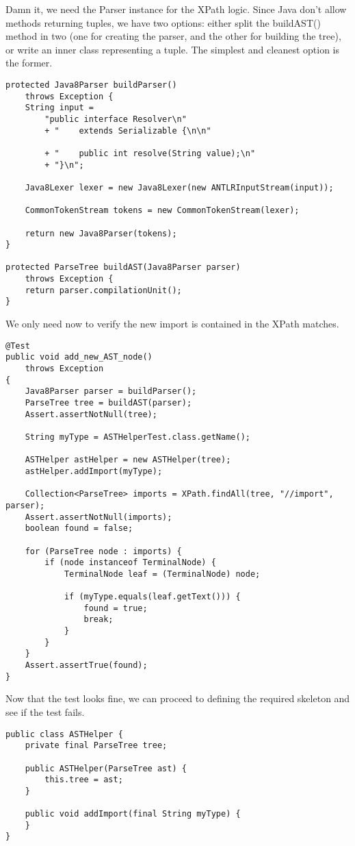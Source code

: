 \documentclass[11pt]{article}
\begin{document}
Damn it, we need the Parser instance for the XPath logic. Since Java don't allow methods returning tuples, we have two options: either split
the buildAST() method in two (one for creating the parser, and the other for building the tree), or write an inner class representing a tuple.
The simplest and cleanest option is the former.

\begin{verbatim}
protected Java8Parser buildParser()
    throws Exception {
    String input =
        "public interface Resolver\n"
        + "    extends Serializable {\n\n"

        + "    public int resolve(String value);\n"
        + "}\n";

    Java8Lexer lexer = new Java8Lexer(new ANTLRInputStream(input));

    CommonTokenStream tokens = new CommonTokenStream(lexer);

    return new Java8Parser(tokens);
}

protected ParseTree buildAST(Java8Parser parser)
    throws Exception {
    return parser.compilationUnit();
}
\end{verbatim}

We only need now to verify the new import is contained in the XPath matches.

\begin{verbatim}
@Test
public void add_new_AST_node()
    throws Exception
{
    Java8Parser parser = buildParser();
    ParseTree tree = buildAST(parser);
    Assert.assertNotNull(tree);

    String myType = ASTHelperTest.class.getName();

    ASTHelper astHelper = new ASTHelper(tree);
    astHelper.addImport(myType);

    Collection<ParseTree> imports = XPath.findAll(tree, "//import", parser);
    Assert.assertNotNull(imports);
    boolean found = false;

    for (ParseTree node : imports) {
        if (node instanceof TerminalNode) {
            TerminalNode leaf = (TerminalNode) node;

            if (myType.equals(leaf.getText())) {
                found = true;
                break;
            }
        }
    }
    Assert.assertTrue(found);
}
\end{verbatim}

Now that the test looks fine, we can proceed to defining the required skeleton and see if the test fails.

\begin{verbatim}
public class ASTHelper {
    private final ParseTree tree;

    public ASTHelper(ParseTree ast) {
        this.tree = ast;
    }

    public void addImport(final String myType) {
    }
}
\end{verbatim}
\end{document}

